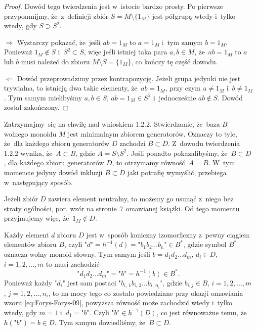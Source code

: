 \documentclass[a4paper,11pt]{article}
\begin{document}
\begin{proof}

  Dowód tego twierdzenia jest w~istocie bardzo prosty. Po pierwsze
  przypomnijmy, że~z~definicji zbiór $S = M \setminus \{ 1_{ M } \}$ jest półgrupą
  wtedy i~tylko wtedy, gdy $S \supset S^{ 2 }$.

  $\Rightarrow$ Wystarczy pokazać, że~jeśli $a b = 1_{ M }$ to $a = 1_{ M }$ i~tym
  samym $b = 1_{ M }$. Ponieważ $1_{ M } \notin S$ i~$S^{ 2 } \subset S$, więc jeśli
  istniej taka para $a, b \in M$, że~$ab = 1_{ M }$ to $a$ lub $b$ musi
  należeć do zbioru $M \setminus S = \{ 1_{ M } \}$, co kończy tę część dowodu.

  $\Leftarrow$ Dowód przeprowadzimy przez kontrapozycję. Jeżeli grupa jedynki nie
  jest trywialna, to istnieją dwa takie elementy, że~$a b = 1_{ M }$, przy
  czym $a \neq 1_{ M }$ i~$b \neq 1_{ M }$. Tym samym mielibyśmy $a, b \in S$,
  $ab = 1_{ M } \in S^{ 2 }$ i~jednocześnie $ab \notin S$. Dowód został zakończony.

\end{proof}





\start {} Zatrzymajmy~się na chwilę nad wnioskiem 1.2.2.
Stwierdzanie, że~baza $B$ wolnego monoidu $M$ jest minimalnym zbiorem
generatorów. Oznaczy to tyle, że~dla każdego zbioru generatorów $D$ zachodzi
$B \subset D$. Z~dowodu twierdzenia 1.2.2 wynika, że~$A \subset B$, gdzie
$A = S \setminus S^{ 2 }$. Jeśli ponadto pokazalibyśmy, że~$B \subset D$, dla każdego
zbioru generatorów $D$, to otrzymamy równość~$A = B$. W~tym momencie
jedyny dowód inkluzji $B \subset D$ jaki potrafię wymyślić, przebiega
w~następujący sposób.

Jeżeli zbiór $D$ zawiera element neutralny, to możemy go usunąć z~niego bez
straty ogólności, por. wzór na stronie~7 omawianej książki. Od tego momentu
przyjmujemy więc, że~$1_{ M } \notin D$.

Każdy element $d$ zbioru $D$ jest w~sposób koniczny izomorficzny z~pewny
ciągiem elementów zbioru $B$, czyli
$\texttt{"} d \texttt{"} = h^{ -1 }( d ) = \texttt{"} b_{ 1 } b_{ 2 } \ldots b_{ n }
\texttt{"} \in B^{ * }$, gdzie symbol $B^{ * }$ oznacza wolny monoid słowny.
Tym samym jeśli $b = d_{ 1 } d_{ 2 } \ldots d_{ m }$,
$d_{ i } \in D$, $i = 1, 2, \ldots, m$ to musi zachodzić
\begin{equation}
  \label{eq:Forys-Forys-29}
  \texttt{"} d_{ 1 } d_{ 2 } \ldots d_{ m } \texttt{"} =
  \texttt{"} b \texttt{"} = h^{ -1 }( b ) \in B^{ * }.
\end{equation}
Ponieważ każdy $\texttt{"} d_{ i } \texttt{"}$ jest sam postaci
$\texttt{"} b_{ i,\, 1 } b_{ i,\, 2 } \ldots b_{ i,\, n_{ i } } \texttt{"}$, gdzie
$b_{ i, j } \in B$, $i = 1, 2, \ldots, m$, $j = 1, 2, \ldots, n_{ i }$, to na mocy tego
co zostało powiedziane przy okazji omawiania wzoru
\eqref{eq:Forys-Forys-09}, powyższa równość może zachodzić wtedy i~tylko
wtedy, gdy $m = 1$ i~$d_{ 1 } = \texttt{"} b \texttt{"}$. Czyli
$\texttt{"} b \texttt{"} \in h^{ -1 }( D )$, co jest równoważne temu,
że~$h( \texttt{"} b \texttt{"} ) = b \in D$. Tym samym dowiedliśmy,
że~$B \subset D$.
\end{document}
